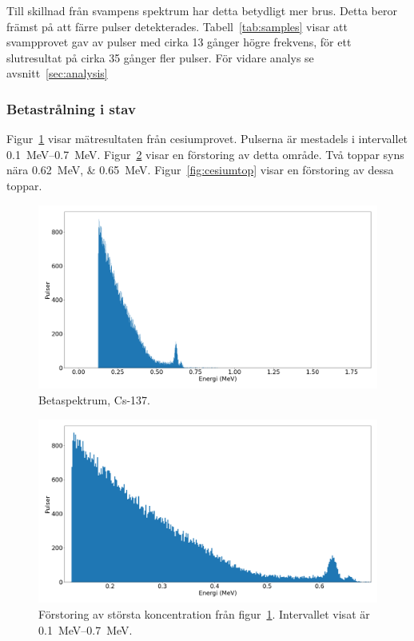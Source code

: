 Till skillnad från svampens spektrum har detta betydligt mer brus. Detta beror
främst på att färre pulser detekterades. Tabell~\ref{tab:samples} visar att
svampprovet gav av pulser med cirka \num{13} gånger högre frekvens, för ett
slutresultat på cirka \num{35} gånger fler pulser. För vidare analys se
avsnitt~\ref{sec:analysis}

\subsubsection{Betastrålning i stav}

Figur~\ref{fig:cesium} visar mätresultaten från cesiumprovet. Pulserna är
mestadels i intervallet \qtyrange{0.1}{0.7}{\MeV}. Figur~\ref{fig:cesiumzoom}
visar en förstoring av detta område. Två toppar syns nära
\qtylist{0.62;0.65}{\MeV}. Figur~\ref{fig:cesiumtop} visar en förstoring av
dessa toppar.

\begin{figure}[htp]
    \centering
    \includegraphics[width=\textwidth, keepaspectratio]{../images/cesium.png}
    \caption{Betaspektrum, Cs-137.}
    \label{fig:cesium}
\end{figure}

\begin{figure}[htp]
    \centering
    \includegraphics[width=\textwidth, keepaspectratio]{../images/cesium_zoom.png}
    \caption{
        Förstoring av största koncentration från figur~\ref{fig:cesium}.
        Intervallet visat är \qtyrange{0.1}{0.7}{\MeV}.
    }
    \label{fig:cesiumzoom}
\end{figure}

